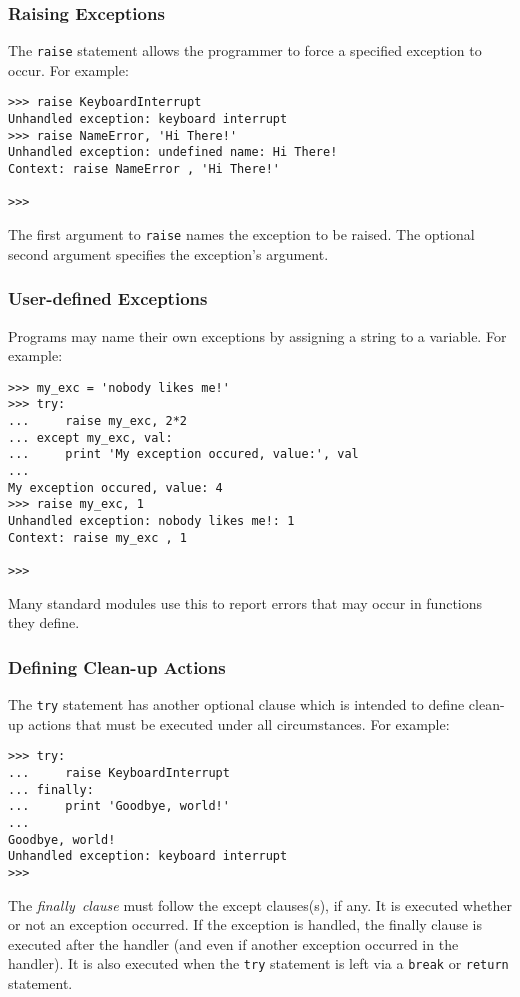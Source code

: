 \subsubsection{Raising Exceptions}

The {\tt raise} statement allows the programmer to force a specified
exception to occur.
For example:
\begin{code}\begin{verbatim}
>>> raise KeyboardInterrupt
Unhandled exception: keyboard interrupt
>>> raise NameError, 'Hi There!'
Unhandled exception: undefined name: Hi There!
Context: raise NameError , 'Hi There!' 

>>> 
\end{verbatim}\end{code}
The first argument to {\tt raise} names the exception to be raised.
The optional second argument specifies the exception's argument.

\subsubsection{User-defined Exceptions}

Programs may name their own exceptions by assigning a string to a
variable.
For example:
\begin{code}\begin{verbatim}
>>> my_exc = 'nobody likes me!'
>>> try:
...     raise my_exc, 2*2
... except my_exc, val:
...     print 'My exception occured, value:', val
... 
My exception occured, value: 4
>>> raise my_exc, 1
Unhandled exception: nobody likes me!: 1
Context: raise my_exc , 1

>>> 
\end{verbatim}\end{code}
Many standard modules use this to report errors that may occur in
functions they define.

\subsubsection{Defining Clean-up Actions}

The {\tt try} statement has another optional clause which is intended to
define clean-up actions that must be executed under all circumstances.
For example:
\begin{code}\begin{verbatim}
>>> try:
...     raise KeyboardInterrupt
... finally:
...     print 'Goodbye, world!'
... 
Goodbye, world!
Unhandled exception: keyboard interrupt
>>> 
\end{verbatim}\end{code}
The
{\it finally\ clause}
must follow the except clauses(s), if any.
It is executed whether or not an exception occurred.
If the exception is handled, the finally clause is executed after the
handler (and even if another exception occurred in the handler).
It is also executed when the {\tt try} statement is left via a
{\tt break} or {\tt return} statement.

